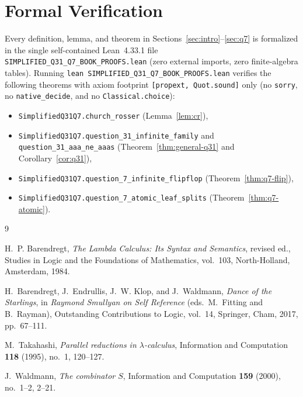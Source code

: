 \documentclass[11pt,reqno]{amsart}
\theoremstyle{definition}
\theoremstyle{remark}
\begin{document}
\section{Formal Verification}\label{sec:lean}

Every definition, lemma, and theorem in Sections~\ref{sec:intro}--\ref{sec:q7} is formalized in the single self-contained Lean~4.33.1 file \texttt{SIMPLIFIED\_Q31\_Q7\_BOOK\_PROOFS.lean} (zero external imports, zero finite-algebra tables). Running \texttt{lean SIMPLIFIED\_Q31\_Q7\_BOOK\_PROOFS.lean} verifies the following theorems with axiom footprint \texttt{[propext, Quot.sound]} only (no \texttt{sorry}, no \texttt{native\_decide}, and no \texttt{Classical.choice}):
\begin{itemize}
  \item \texttt{SimplifiedQ31Q7.church\_rosser} (Lemma~\ref{lem:cr}),
  \item \texttt{SimplifiedQ31Q7.question\_31\_infinite\_family} and \texttt{question\_31\_aaa\_ne\_aaas} (Theorem~\ref{thm:general-q31} and Corollary~\ref{cor:q31}),
  \item \texttt{SimplifiedQ31Q7.question\_7\_infinite\_flipflop} (Theorem~\ref{thm:q7-flip}),
  \item \texttt{SimplifiedQ31Q7.question\_7\_atomic\_leaf\_splits} (Theorem~\ref{thm:q7-atomic}).
\end{itemize}

\begin{thebibliography}{9}

H.~P. Barendregt, \emph{The Lambda Calculus: Its Syntax and Semantics}, revised ed., Studies in Logic and the Foundations of Mathematics, vol.~103, North-Holland, Amsterdam, 1984.

H.~Barendregt, J.~Endrullis, J.~W. Klop, and J.~Waldmann, \emph{Dance of the Starlings}, in \emph{Raymond Smullyan on Self Reference} (eds.\ M.~Fitting and B.~Rayman), Outstanding Contributions to Logic, vol.~14, Springer, Cham, 2017, pp.~67--111.

M.~Takahashi, \emph{Parallel reductions in $\lambda$-calculus}, Information and Computation \textbf{118} (1995), no.~1, 120--127.

J.~Waldmann, \emph{The combinator $S$}, Information and Computation \textbf{159} (2000), no.~1--2, 2--21.

\end{thebibliography}
\end{document}
